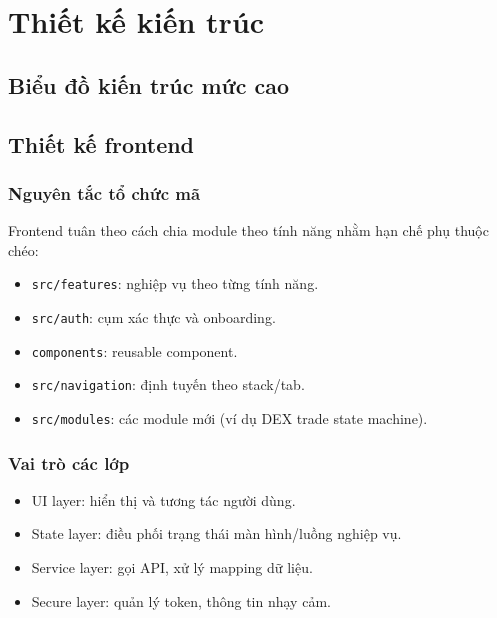 \documentclass[a4paper,12pt]{report}
\begin{document}
\chapter{Thiết kế kiến trúc}

\section{Biểu đồ kiến trúc mức cao}
\begin{center}
\end{center}

\section{Thiết kế frontend}
\subsection{Nguyên tắc tổ chức mã}
Frontend tuân theo cách chia module theo tính năng nhằm hạn chế phụ thuộc chéo:
\begin{itemize}
    \item \texttt{src/features}: nghiệp vụ theo từng tính năng.
    \item \texttt{src/auth}: cụm xác thực và onboarding.
    \item \texttt{components}: reusable component.
    \item \texttt{src/navigation}: định tuyến theo stack/tab.
    \item \texttt{src/modules}: các module mới (ví dụ DEX trade state machine).
\end{itemize}

\subsection{Vai trò các lớp}
\begin{itemize}
    \item UI layer: hiển thị và tương tác người dùng.
    \item State layer: điều phối trạng thái màn hình/luồng nghiệp vụ.
    \item Service layer: gọi API, xử lý mapping dữ liệu.
    \item Secure layer: quản lý token, thông tin nhạy cảm.
\end{itemize}
\end{document}
